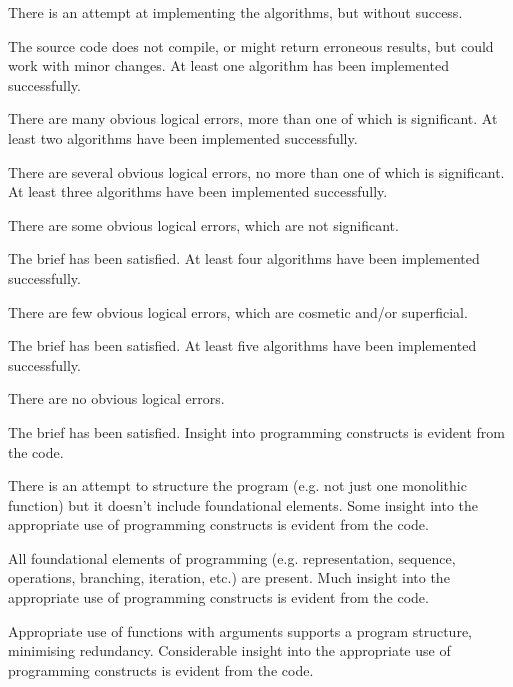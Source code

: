 \documentclass{../../fal_assignment}
\begin{document}
\begin{markingrubric}
        \grade\fail 	There is an attempt at implementing the algorithms, but without success.
            \par 		The source code does not compile, or might return erroneous results, but could work with minor changes.
        \grade 		At least one algorithm has been implemented successfully.
            \par 		There are many obvious logical errors, more than one of which is significant.   
        \grade 		At least two algorithms have been  implemented successfully.
            \par 		There are several obvious logical errors, no more than one of which is significant. 
        \grade 		At least three algorithms have been implemented successfully.
            \par 		There are some obvious logical errors, which are not significant. 
            \par		The brief has been satisfied.
        \grade 		At least four algorithms have been implemented successfully.
            \par 		There are few obvious logical errors, which are cosmetic and/or superficial.
            \par		The brief has been satisfied.     
        \grade 		At least five algorithms have been implemented successfully.
            \par		There are no obvious logical errors.
            \par		The brief has been satisfied.
%
        \grade\fail Insight into programming constructs is evident from the code.
            \par There is an attempt to structure the program (e.g. not just one monolithic function) but it doesn't include foundational elements.
        \grade Some insight into the appropriate use of programming constructs is evident from the code.
            \par All foundational elements of programming (e.g. representation, sequence, operations, branching, iteration, etc.) are present.
        \grade Much insight into the appropriate use of programming constructs is evident from the code.
            \par Appropriate use of functions with arguments supports a program structure, minimising redundancy.
        \grade Considerable insight into the appropriate use of programming constructs is evident from the code.

\end{markingrubric}
\end{document}
